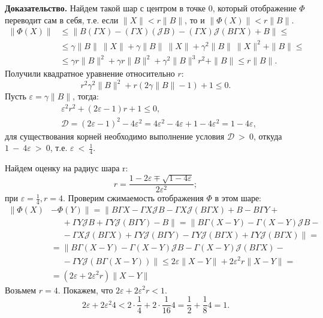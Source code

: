 \noindent\textbf{Доказательство.}
Найдем такой шар с центром в точке 0, который отображение $\Phi$ переводит сам в себя, т.е. если $\|X\|<r\|B\|$, то и $\|\Phi(X)\|<r\|B\|$.
\begin{align*}
\|\Phi(X)\| &\leq \|B(\Gamma X)-(\Gamma X)(\mathcal{J}B)-(\Gamma X)\mathcal{J}(B\Gamma X)+B\| \leq \\
&\leq \gamma \|B\|~ \|X\|+\gamma \|B\|~ \|X\|+\gamma^2 \|B\|~ \|X\|^2 + \|B\| \leq \\ 
&\leq \gamma r \|B\|^2+\gamma r \|B\|^2+\gamma^2 \|B\|^3 r^2 + \|B\| \leq r\|B\|.
\end{align*}
Получили квадратное уравнение относительно $r$:
$$
r^2 \gamma^2 \|B\|^2 + r (2\gamma \|B\|-1)+1 \leq 0.
$$
Пусть $\varepsilon=\gamma \|B\|$, тогда:
\begin{align*}
&\varepsilon^2 r^2 + (2 \varepsilon - 1)r + 1 \leq 0, \\  
&\mathcal{D}=(2\varepsilon-1)^2 - 4\varepsilon^2 = 4\varepsilon^2-4\varepsilon+1-4\varepsilon^2=1-4\varepsilon,
\end{align*}
для существования корней необходимо выполнение условия $\mathcal{D}~>~0$, откуда $1~-~4\varepsilon~>~0$, т.е. $\varepsilon~<~\frac{1}{4}$.

Найдем оценку на радиус шара r:
$$
r=\frac{1-2\varepsilon\mp\sqrt{1-4\varepsilon}}{2\varepsilon^2};
$$
при $\varepsilon=\frac{1}{4}, r=4.$
Проверим сжимаемость отображения $\Phi$ в этом шаре:
\begin{align*}
\|\Phi (X) &- \Phi (Y) \| = \| B\Gamma X - \Gamma X\mathcal{J}B - \Gamma X\mathcal{J}(B\Gamma X) + B - B\Gamma Y + \\ 
 & \phantom{=} + \Gamma Y\mathcal{J}B + \Gamma Y\mathcal{J}(B\Gamma Y) -B\| = \| B\Gamma (X-Y) - \Gamma (X-Y) \mathcal{J}B - \\
 & \phantom{=} - \Gamma X\mathcal{J}(B\Gamma X) + \Gamma Y\mathcal{J} (B\Gamma Y) - \Gamma Y\mathcal{J}(B\Gamma X) + \Gamma Y\mathcal{J}(B\Gamma X) \| = \\
 &= \| B\Gamma(X - Y) - \Gamma (X-Y)\mathcal{J}B - \Gamma (X- Y) \mathcal{J}(B\Gamma X) - \\
 & \phantom{=} - \Gamma Y\mathcal{J}(B\Gamma (X - Y)) \| \leqslant 2\varepsilon \| X-Y \| + 2\varepsilon ^2 r\| X-Y \| = \\
 & = (2\varepsilon + 2\varepsilon ^2 r)\| X-Y \| 
\end{align*}
Возьмем $r = 4.$ Покажем, что $2\varepsilon + 2\varepsilon ^2 r < 1.$
$$
2\varepsilon + 2\varepsilon ^2 4 < 2 \cdot \frac{1}{4} + 2 \cdot \frac{1}{16} 4 = \frac{1}{2} + \frac{1}{8} 4 = 1.
$$

